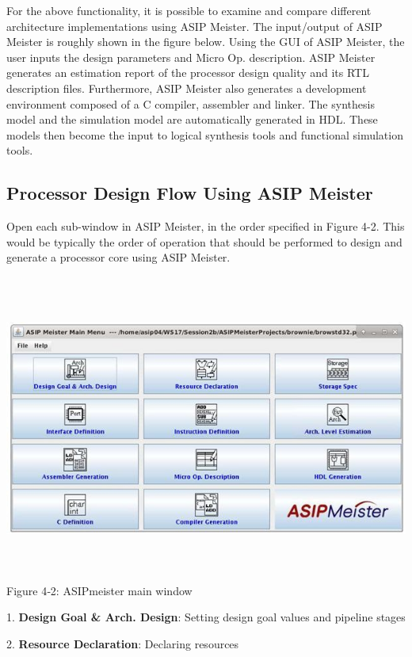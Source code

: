 \documentclass[
]{article}
\begin{document}
For the above functionality, it is possible to examine and compare
different architecture implementations using ASIP Meister. The
input/output of ASIP Meister is roughly shown in the figure below. Using
the GUI of ASIP Meister, the user inputs the design parameters and Micro
Op. description. ASIP Meister generates an estimation report of the
processor design quality and its RTL description files. Furthermore,
ASIP Meister also generates a development environment composed of a C
compiler, assembler and linker. The synthesis model and the simulation
model are automatically generated in HDL. These models then become the
input to logical synthesis tools and functional simulation tools.

\hypertarget{processor-design-flow-using-asip-meister}{%
\subsection{Processor Design Flow Using ASIP
Meister}\label{processor-design-flow-using-asip-meister}}

Open each sub-window in ASIP Meister, in the order specified in Figure
4-2. This would be typically the order of operation that should be
performed to design and generate a processor core using ASIP Meister.

\includegraphics[width=6.09196in,height=3.97917in]{4-2.png}
Figure 4‑2: ASIPmeister main window

1. \textbf{Design Goal \& Arch. Design}: Setting design goal values and
pipeline stages

2. \textbf{Resource Declaration}: Declaring resources
\end{document}
